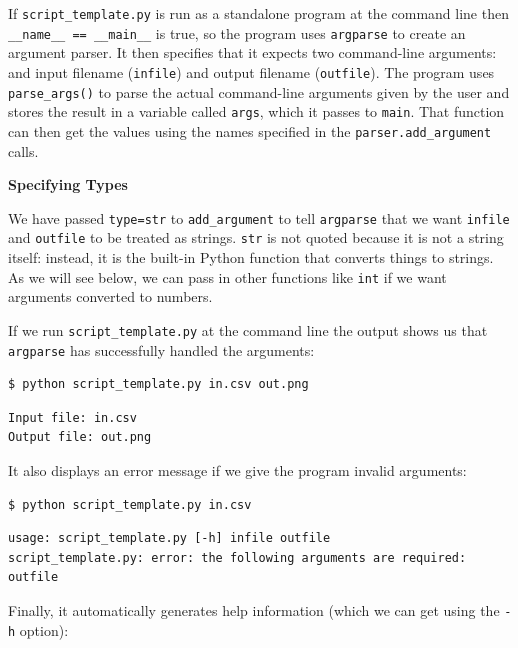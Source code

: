 \documentclass[
]{krantz}
\renewenvironment{quote}{\begin{VF}}{\end{VF}}
\begin{document}
If \texttt{script\_template.py} is run as a standalone program at the command line
then \texttt{\_\_name\_\_\ ==\ \textquotesingle{}\_\_main\_\_\textquotesingle{}} is true,
so the program uses \texttt{argparse} to create an argument parser.
It then specifies that it expects two command-line arguments:
and input filename (\texttt{infile}) and output filename (\texttt{outfile}).
The program uses \texttt{parse\_args()} to parse the actual command-line arguments given by the user
and stores the result in a variable called \texttt{args},
which it passes to \texttt{main}.
That function can then get the values using the names specified
in the \texttt{parser.add\_argument} calls.

\begin{quote}
\textbf{Specifying Types}

We have passed \texttt{type=str} to \texttt{add\_argument} to tell \texttt{argparse} that
we want \texttt{infile} and \texttt{outfile} to be treated as strings.
\texttt{str} is not quoted because it is not a string itself:
instead,
it is the built-in Python function that converts things to strings.
As we will see below,
we can pass in other functions like \texttt{int}
if we want arguments converted to numbers.
\end{quote}

If we run \texttt{script\_template.py} at the command line
the output shows us that \texttt{argparse} has successfully handled the arguments:

\begin{verbatim}
$ python script_template.py in.csv out.png
\end{verbatim}

\begin{verbatim}
Input file: in.csv
Output file: out.png
\end{verbatim}

It also displays an error message if we give the program invalid arguments:

\begin{verbatim}
$ python script_template.py in.csv
\end{verbatim}

\begin{verbatim}
usage: script_template.py [-h] infile outfile
script_template.py: error: the following arguments are required: outfile
\end{verbatim}

Finally,
it automatically generates help information
(which we can get using the \texttt{-h} option):
\end{document}
